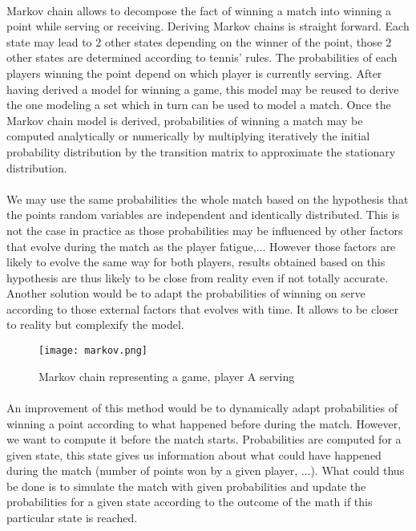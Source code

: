 \documentclass[a4paper,9pt]{report}
\theoremstyle{mytheor}
\begin{document}
\paragraph{}
Markov chain allows to decompose the fact of winning a match into winning a point while serving or receiving. Deriving Markov chains is straight forward. Each state may lead to 2 other states depending on the winner of the point, those 2 other states are determined according to tennis' rules. The probabilities of each players winning the point depend on which player is currently serving. After having derived a model for winning a game, this model may be reused to derive the one modeling a set which in turn can be used to model a match. Once the Markov chain model is derived, probabilities of winning a match may be computed analytically or numerically by multiplying iteratively the initial probability distribution by the transition matrix to approximate the stationary distribution.
\paragraph{}
We may use the same probabilities the whole match based on the hypothesis that the points random variables are independent and identically distributed. This is not the case in practice as those probabilities may be influenced by other factors that evolve during the match as the player fatigue,... However those factors are likely to evolve the same way for both players, results obtained based on this hypothesis are thus likely to be close from reality even if not totally accurate. Another solution would be to adapt the probabilities of winning on serve according to those external factors that evolves with time. It allows to be closer to reality but complexify the model.

\begin{figure}[!h]
\begin{center}
\texttt{[image: markov.png]}
\caption{\label{markov} Markov chain representing a game, player A serving}
\end{center}
\end{figure}

\paragraph{}
An improvement of this method would be to dynamically adapt probabilities of winning a point according to what happened before during the match. However, we want to compute it before the match starts. Probabilities are computed for a given state, this state gives us information about what could have happened during the match (number of points won by a given player, ...). What could thus be done is to simulate the match with given probabilities and update the probabilities for a given state according to the outcome of the math if this particular state is reached.
\end{document}
